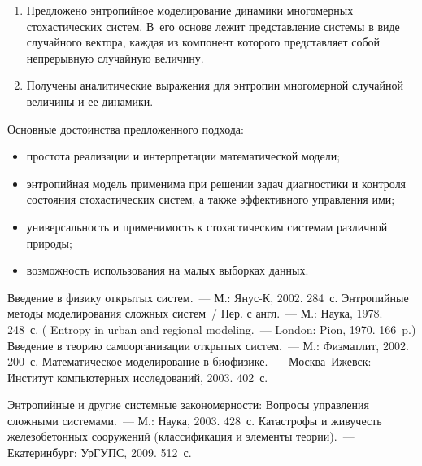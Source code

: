 \begin{multicols}{2}
  \noindent
  \begin{enumerate}[1.]
  \item  Предложено энтропийное моделирование динамики многомерных 
стохастических систем. В~его основе лежит представление системы в виде 
случайного вектора, каждая из компонент которого представляет собой 
непрерывную случайную величину.
\item Получены аналитические выражения для энтропии многомерной 
случайной величины и ее динамики.
\end{enumerate}

Основные достоинства предложенного подхода:
  \begin{itemize}
  \item простота реализации и интерпретации математической модели;
  \item энтропийная модель применима при решении задач диагностики и 
контроля состояния стохастических сис\-тем, а также эффективного управ\-ле\-ния 
ими;
  \item универсальность и применимость к стохастическим системам 
различной природы;
  \item возможность использования на малых выборках данных.
  \end{itemize}
  
{\small\frenchspacing
{%
\begin{thebibliography}{99}
   Введение в физику открытых сис\-тем.~--- М.: 
Янус-К, 2002. 284~с.
   Энтропийные методы моделирования слож\-ных 
  сис\-тем~/ Пер. с англ.~--- М.: Наука, 1978.  248~с. (
  Entropy in urban and regional modeling.~--- London: Pion, 1970. 166~p.)
   Введение в 
  тео\-рию самоорганизации открытых сис\-тем.~--- М.: Физматлит, 2002. 200~с.
Математическое моделирование в биофизике.~--- Москва--Ижевск: Институт 
компьютерных исследований, 2003. 402~с.


   Энтропийные и другие сис\-тем\-ные 
закономерности: Вопросы управ\-ле\-ния сложными сис\-те\-ма\-ми.~--- М.: 
Наука, 2003. 428~с.
   Катастрофы и живучесть железобетонных 
сооружений (классификация и элементы теории).~--- Екатеринбург: УрГУПС, 
2009. 512~с.


\end{thebibliography}}}
\end{multicols}
